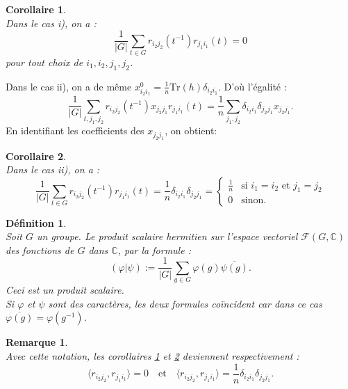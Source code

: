 \documentclass[a4paper, 14pt]{report}
\newtheorem{definition}{Définition}[section]
\newtheorem{remark}{Remarque}[section]
\newtheorem{corollary}{Corollaire}[section]
\begin{document}
\begin{onehalfspace}
{\begin{corollary} \cite{serre1971representation} \label{cor2}\\
Dans le cas i), on a :
\[
\frac{1}{|G|} \sum_{t \in G} r_{i_2 j_2}(t^{-1}) r_{j_1 i_1}(t) = 0
\]
pour tout choix de $i_1, i_2, j_1, j_2$. \\
\end{corollary}

Dans le cas ii), on a de même  $x^0_{i_2 i_1} = \frac{1}{n} \text{Tr}(h) \delta_{i_2 i_1}$. D’où l’égalité :
\[
\frac{1}{|G|} \sum_{t, j_1, j_2} r_{i_2 j_2}(t^{-1}) x_{j_2 j_1} r_{j_1 i_1}(t)
= \frac{1}{n} \sum_{j_1, j_2} \delta_{i_2 i_1} \delta_{j_2 j_1} x_{j_2 j_1}.
\]
En identifiant les coefficients des $x_{j_2 j_1}$, on obtient:

\begin{corollary} \cite{serre1971representation} \label{cor3}\\
	
Dans le cas ii), on a :
\[
\frac{1}{|G|} \sum_{t \in G} r_{i_2 j_2}(t^{-1}) r_{j_1 i_1}(t)
= \frac{1}{n} \delta_{i_2 i_1} \delta_{j_2 j_1}
= \begin{cases}
	\frac{1}{n} & \text{si } i_1 = i_2 \text{ et } j_1 = j_2 \\
	0 & \text{sinon}.
\end{cases}
\]
\end{corollary}


\begin{definition} \cite{serre1971representation}\\
Soit $G$ un groupe. Le produit scalaire hermitien sur l’espace vectoriel $\mathscr{F}(G, \mathbb{C})$ des fonctions de $G$ dans $\mathbb{C}$, par la formule :
	\[
	(\varphi | \psi) := \frac{1}{|G|} \sum_{g \in G} \varphi(g) \overline{\psi(g)}.
	\]
Ceci est un produit scalaire.\\
Si $\varphi$ et $\psi$ sont des caractères, les deux formules coïncident car dans ce cas $\overline{\varphi(g)} = \varphi(g^{-1})$.
\end{definition}

\begin{remark} \cite{serre1971representation} \label{remarq0}\\
Avec cette notation, les corollaires \ref{cor2} et \ref{cor3} deviennent respectivement :
\[
\langle r_{i_2 j_2}, r_{j_1 i_1} \rangle = 0 \quad \text{et} \quad
\langle r_{i_2 j_2}, r_{j_1 i_1} \rangle = \frac{1}{n} \delta_{i_2 i_1} \delta_{j_2 j_1}.
\]
\end{remark}

}
\end{onehalfspace}
\end{document}
